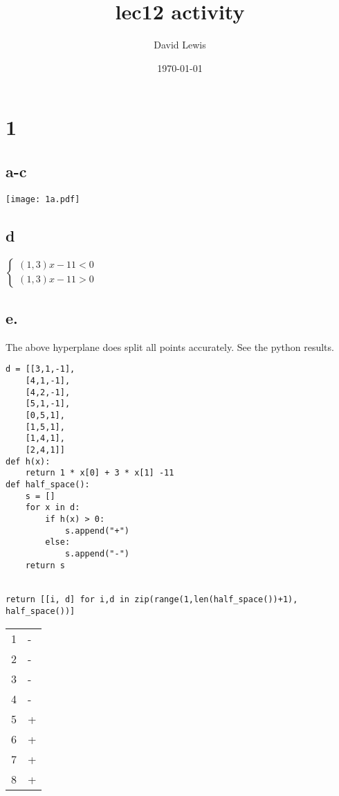 \documentclass[11pt]{article}
\author{David Lewis}
\date{\today}
\title{lec12 activity}
\begin{document}
\maketitle
\section*{1}
\label{sec:org081970e}
\subsection*{a-c}
\label{sec:org612c30e}
\begin{center}
\texttt{[image: 1a.pdf]}
\end{center}
\subsection*{d}
\label{sec:org92da8e6}
\(\begin{cases} (1,3)x -11 < 0 \\ (1,3)x-11 > 0 \end{cases}\)
\subsection*{e.}
\label{sec:orga36db17}
The above hyperplane does split all points accurately. See the python results.
\begin{verbatim}
d = [[3,1,-1],
    [4,1,-1],
    [4,2,-1],
    [5,1,-1],
    [0,5,1],
    [1,5,1],
    [1,4,1],
    [2,4,1]]
def h(x):
    return 1 * x[0] + 3 * x[1] -11
def half_space():
    s = []
    for x in d:
        if h(x) > 0:
            s.append("+")
        else:
            s.append("-")
    return s


return [[i, d] for i,d in zip(range(1,len(half_space())+1), half_space())]
\end{verbatim}

\begin{center}
\begin{tabular}{rl}
1 & -\\
2 & -\\
3 & -\\
4 & -\\
5 & +\\
6 & +\\
7 & +\\
8 & +\\
\end{tabular}
\end{center}
\end{document}
